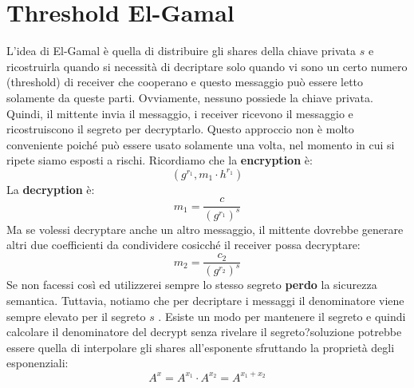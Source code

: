 \documentclass{book}
\begin{document}
\section{Threshold El-Gamal}
L'idea di El-Gamal è quella di distribuire gli shares della chiave privata \(s\) e ricostruirla quando si necessità di decriptare solo quando vi sono un certo numero (threshold) di receiver che cooperano e questo messaggio può essere letto solamente da queste parti\@. Ovviamente, nessuno possiede la chiave privata\@.\newline
Quindi, il mittente invia il messaggio, i receiver ricevono il messaggio e ricostruiscono il segreto per decryptarlo\@. Questo approccio non è molto conveniente poiché può essere usato solamente una volta, nel momento in cui si ripete siamo esposti a rischi\@.\newline
Ricordiamo che la \textbf{encryption} è:\begin{equation*}
	(g^{r_{1}},m_{1}\cdot h^{r_{1}})
\end{equation*}
La \textbf{decryption} è:\begin{equation*}
	m_{1}=\frac{c}{{(g^{r_{1}})}^{s}}
\end{equation*}
Ma se volessi decryptare anche un altro messaggio, il mittente dovrebbe generare altri due coefficienti da condividere cosicché il receiver possa decryptare:\begin{equation*}
	m_{2}=\frac{c_{2}}{{(g^{r_{2}})}^{s}}
\end{equation*}
Se non facessi così ed utilizzerei sempre lo stesso segreto \textbf{perdo} la sicurezza semantica\@. Tuttavia, notiamo che per decriptare i messaggi il denominatore viene sempre elevato per il segreto \(s\) \@. Esiste un modo per mantenere il segreto e quindi calcolare il denominatore del decrypt senza rivelare il segreto?\@Una soluzione potrebbe essere quella di interpolare gli shares all'esponente sfruttando la proprietà degli esponenziali:\begin{equation*}
	A^{x}=A^{x_{1}}\cdot A^{x_{2}}=A^{x_{1}+x_{2}}
\end{equation*}
\newpage
\end{document}
